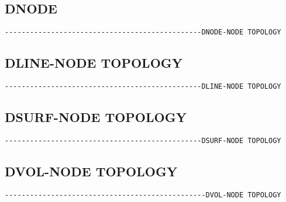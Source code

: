 \subsection{DNODE}
\begin{verbatim}
-----------------------------------------------DNODE-NODE TOPOLOGY
\end{verbatim}



\subsection{DLINE-NODE TOPOLOGY}
\begin{verbatim}
-----------------------------------------------DLINE-NODE TOPOLOGY
\end{verbatim}



\subsection{DSURF-NODE TOPOLOGY}
\begin{verbatim}
-----------------------------------------------DSURF-NODE TOPOLOGY
\end{verbatim}



\subsection{DVOL-NODE TOPOLOGY}
\begin{verbatim}
------------------------------------------------DVOL-NODE TOPOLOGY
\end{verbatim}


